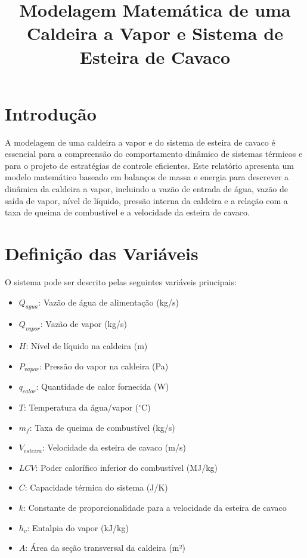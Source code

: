\documentclass{article}
\title{Modelagem Matem\'atica de uma Caldeira a Vapor e Sistema de Esteira de Cavaco}
\author{}
\date{}
\begin{document}
\maketitle

\section{Introdu\c{c}\~ao}
A modelagem de uma caldeira a vapor e do sistema de esteira de cavaco é essencial para a compreensão do comportamento dinâmico de sistemas térmicos e para o projeto de estratégias de controle eficientes. Este relatório apresenta um modelo matemático baseado em balanços de massa e energia para descrever a dinâmica da caldeira a vapor, incluindo a vazão de entrada de água, vazão de saída de vapor, nível de líquido, pressão interna da caldeira e a relação com a taxa de queima de combustível e a velocidade da esteira de cavaco.

\section{Defini\c{c}\~ao das Vari\'aveis}
O sistema pode ser descrito pelas seguintes variáveis principais:
\begin{itemize}
    \item $Q_{agua}$: Vaz\~ao de água de alimentação (kg/s)
    \item $Q_{vapor}$: Vaz\~ao de vapor (kg/s)
    \item $H$: Nível de líquido na caldeira (m)
    \item $P_{vapor}$: Pressão do vapor na caldeira (Pa)
    \item $q_{calor}$: Quantidade de calor fornecida (W)
    \item $T$: Temperatura da água/vapor ($^{\circ}$C)
    \item $m_f$: Taxa de queima de combustível (kg/s)
    \item $V_{esteira}$: Velocidade da esteira de cavaco (m/s)
    \item $LCV$: Poder calorífico inferior do combustível (MJ/kg)
    \item $C$: Capacidade térmica do sistema (J/K)
    \item $k$: Constante de proporcionalidade para a velocidade da esteira de cavaco
    \item $h_v$: Entalpia do vapor (kJ/kg)
    \item $A$: Área da seção transversal da caldeira (m²)
\end{itemize}
\end{document}
